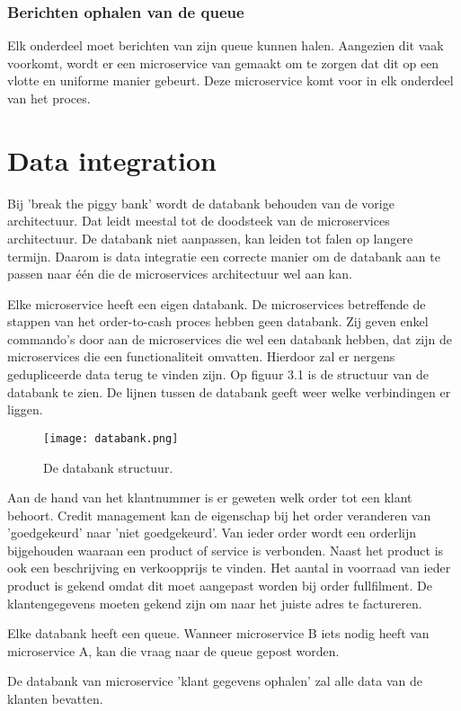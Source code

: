 \subsubsection{Berichten ophalen van de queue} 
Elk onderdeel moet berichten van zijn queue kunnen halen. Aangezien dit vaak voorkomt, wordt er een microservice van gemaakt om te zorgen dat dit op een vlotte en uniforme manier gebeurt. 
Deze microservice komt voor in elk onderdeel van het proces.

\section{Data integration}
Bij 'break the piggy bank' wordt de databank behouden van de vorige architectuur. Dat leidt meestal tot de doodsteek van de microservices architectuur. De databank niet aanpassen, kan leiden tot falen op langere termijn. Daarom is data integratie een correcte manier om de databank aan te passen naar één die de microservices architectuur wel aan kan.

Elke microservice heeft een eigen databank. De microservices betreffende de stappen van het order-to-cash proces hebben geen databank. Zij geven enkel commando's door aan de microservices die wel een databank hebben, dat zijn de microservices die een functionaliteit omvatten. Hierdoor zal er nergens gedupliceerde data terug te vinden zijn. Op figuur 3.1 is de structuur van de databank te zien. De lijnen tussen de databank geeft weer welke verbindingen er liggen. 
\begin{figure}[h!]
	\texttt{[image: databank.png]}
	\caption{De databank structuur.}
	\centering
\end{figure}

Aan de hand van het klantnummer is er geweten welk order tot een klant behoort. Credit management kan de eigenschap bij het order veranderen van 'goedgekeurd' naar 'niet goedgekeurd'. Van ieder order wordt een orderlijn bijgehouden waaraan een product of service is verbonden. Naast het product is ook een beschrijving en verkoopprijs te vinden. Het aantal in voorraad van ieder product is gekend omdat dit moet aangepast worden bij order fullfilment. De klantengegevens moeten gekend zijn om naar het juiste adres te factureren.

Elke databank heeft een queue. Wanneer microservice B iets nodig heeft van microservice A, kan die vraag naar de queue gepost worden.

De databank van microservice 'klant gegevens ophalen' zal alle data van de klanten bevatten.

